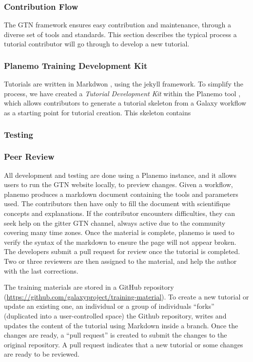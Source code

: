 \documentclass[10pt,letterpaper]{article}
\begin{document}
\subsubsection*{Contribution Flow}

The GTN framework ensures easy contribution and maintenance, through a diverse set of tools and standards.
This section describes the typical process a tutorial contributor will go through to develop a new tutorial.

\subsubsection*{Planemo Training Development Kit}
Tutorials are written in Markdwon \cite{}, using the jekyll \cite{} framework. To simplify the process, we have created a \emph{Tutorial Development Kit} within the Planemo tool \cite{TODO}, which allows contributors to generate a tutorial skeleton from a Galaxy workflow as a starting point for tutorial creation. This skeleton contains


\subsubsection*{Testing}

\subsubsection*{Peer Review}




All development and testing are done using a Planemo instance, and it allows users to run the GTN website locally, to preview changes.
Given a workflow, planemo produces a markdown document containing the tools and parameters used.
The contributors then have only to fill the document with scientifique concepts and explanations.
If the contributor encounters difficulties, they can seek help on the gitter GTN channel, always active due to the community covering many time zones.
Once the material is complete, planemo is used to verify the syntax of the markdown to ensure the page will not appear broken.
The developers submit a pull request for review once the tutorial is completed.
Two or three reviewers are then assigned to the material, and help the author with the last corrections.


The training materials are stored in a GitHub repository (\url{https://github.com/galaxyproject/training-material}).
To create a new tutorial or update an existing one, an individual or a group of individuals “forks” (duplicated into a user-controlled space) the Github repository, writes and updates the content of the tutorial using Markdown inside a branch.
Once the changes are ready, a “pull request” is created to submit the changes to the original repository.
A pull request indicates that a new tutorial or some changes are ready to be reviewed.
\end{document}
